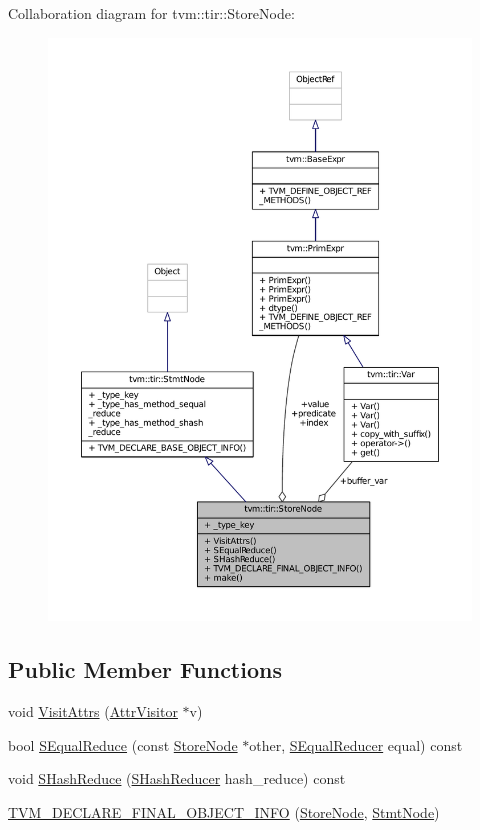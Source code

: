 Collaboration diagram for tvm\+:\+:tir\+:\+:Store\+Node\+:
\nopagebreak
\begin{figure}[H]
\begin{center}
\leavevmode
\includegraphics[width=350pt]{classtvm_1_1tir_1_1StoreNode__coll__graph}
\end{center}
\end{figure}
\subsection*{Public Member Functions}
\begin{DoxyCompactItemize}
\item 
void \hyperlink{classtvm_1_1tir_1_1StoreNode_a3f6c20a2767139e3a6555554f1e130a4}{Visit\+Attrs} (\hyperlink{classtvm_1_1AttrVisitor}{Attr\+Visitor} $\ast$v)
\item 
bool \hyperlink{classtvm_1_1tir_1_1StoreNode_a1fdbfaef5042c83fc109a1e53a6cdc74}{S\+Equal\+Reduce} (const \hyperlink{classtvm_1_1tir_1_1StoreNode}{Store\+Node} $\ast$other, \hyperlink{classtvm_1_1SEqualReducer}{S\+Equal\+Reducer} equal) const 
\item 
void \hyperlink{classtvm_1_1tir_1_1StoreNode_a70ef320d87e4f42f7d4abe43d6c9c980}{S\+Hash\+Reduce} (\hyperlink{classtvm_1_1SHashReducer}{S\+Hash\+Reducer} hash\+\_\+reduce) const 
\item 
\hyperlink{classtvm_1_1tir_1_1StoreNode_ab320356d8d0645fc93ea21cad679b0c3}{T\+V\+M\+\_\+\+D\+E\+C\+L\+A\+R\+E\+\_\+\+F\+I\+N\+A\+L\+\_\+\+O\+B\+J\+E\+C\+T\+\_\+\+I\+N\+FO} (\hyperlink{classtvm_1_1tir_1_1StoreNode}{Store\+Node}, \hyperlink{classtvm_1_1tir_1_1StmtNode}{Stmt\+Node})
\end{DoxyCompactItemize}
